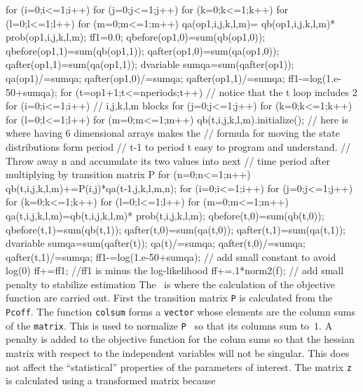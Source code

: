 \documentclass[12pt]{book}
\begin{document}
  for (i=0;i<=1;i++) {
    for (j=0;j<=1;j++) {
      for (k=0;k<=1;k++) {
        for (l=0;l<=1;l++) {
          for (m=0;m<=1;m++) qa(op1,i,j,k,l,m)= qb(op1,i,j,k,l,m)*
            prob(op1,i,j,k,l,m);
        }
      }
    }                            
  }  
  ff1=0.0;
  qbefore(op1,0)=sum(qb(op1,0));
  qbefore(op1,1)=sum(qb(op1,1));
  qafter(op1,0)=sum(qa(op1,0));
  qafter(op1,1)=sum(qa(op1,1));
  dvariable sumqa=sum(qafter(op1));
  qa(op1)/=sumqa;
  qafter(op1,0)/=sumqa;
  qafter(op1,1)/=sumqa;
  ff1-=log(1.e-50+sumqa);
  for (t=op1+1;t<=nperiods;t++) { // notice that the t loop includes 2 
    for (i=0;i<=1;i++) {      // i,j,k,l,m blocks
      for (j=0;j<=1;j++) {
        for (k=0;k<=1;k++) {
          for (l=0;l<=1;l++) {
            for (m=0;m<=1;m++) {
              qb(t,i,j,k,l,m).initialize(); 
              // here is where having 6 dimensional arrays makes the
              // formula for moving the state distributions form period
              // t-1 to period t easy to program and understand.
              // Throw away  n and accumulate its two values into next
              // time period after multiplying by transition matrix P
              for (n=0;n<=1;n++) qb(t,i,j,k,l,m)+=P(i,j)*qa(t-1,j,k,l,m,n); 
            }
          }
        }
      }                            
    }  
    for (i=0;i<=1;i++) {
      for (j=0;j<=1;j++) {
        for (k=0;k<=1;k++) {
          for (l=0;l<=1;l++) {
            for (m=0;m<=1;m++) qa(t,i,j,k,l,m)=qb(t,i,j,k,l,m)*
                  prob(t,i,j,k,l,m);
          }
        }
      }                            
    }  
    qbefore(t,0)=sum(qb(t,0));
    qbefore(t,1)=sum(qb(t,1));
    qafter(t,0)=sum(qa(t,0));
    qafter(t,1)=sum(qa(t,1));
    dvariable sumqa=sum(qafter(t));
    qa(t)/=sumqa;
    qafter(t,0)/=sumqa;
    qafter(t,1)/=sumqa;
    ff1-=log(1.e-50+sumqa); // add small constant to avoid log(0)
  }  
  ff+=ff1; //ff1 is minus the log-likelihood
  ff+=.1*norm2(f); // add small penalty to stabilize estimation
\endexample
The \PROS\ is where the calculation of the objective function are 
carried out.  First the transition matrix {\tt P} is calculated from
the {\tt Pcoff}. The function {\tt colsum} forms a {\tt vector} whose
elements are the column sums of the {\tt matrix}. This is used to normalize
{\tt P
} so that its columns sum to~$1$. A penalty is added to
the objective function for the colum sums so that the hessian matrix 
with respect to the independent variables will not be singular. This does not affect
 the ``statistical'' properties of the parameters of interest.
The matrix {\tt z} is calculated using a transformed matrix because
\end{document}
